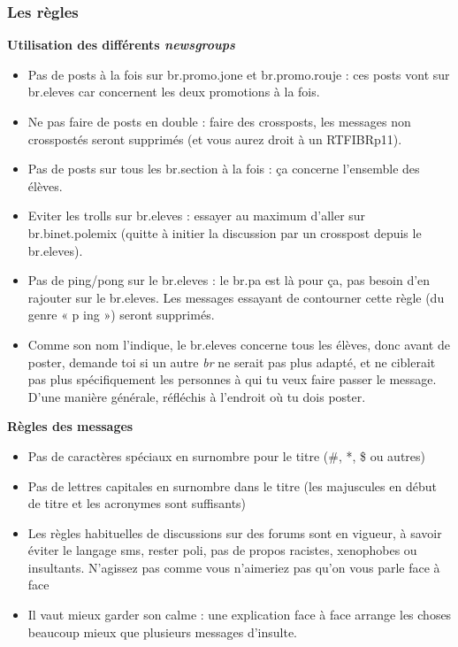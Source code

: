 \subsubsection{Les règles}
\textbf{Utilisation des différents \emph{newsgroups}}
\begin{itemize}
 \item Pas de posts à la fois sur br.promo.jone et br.promo.rouje : ces posts vont sur br.eleves car concernent les deux promotions à
       la fois.
 \item Ne pas faire de posts en double : faire des crossposts, les messages non crosspostés seront supprimés (et vous aurez droit à
       un RTFIBRp11).
 \item Pas de posts sur tous les br.section à la fois : ça concerne l'ensemble des élèves.
 \item Eviter les trolls sur br.eleves : essayer au maximum d'aller sur br.binet.polemix (quitte à initier la discussion par un
       crosspost depuis le br.eleves).
 \item Pas de ping/pong sur le br.eleves : le br.pa est là pour ça, pas besoin d'en rajouter sur le br.eleves. Les messages essayant
       de contourner cette règle (du genre « p ing ») seront supprimés.
 \item Comme son nom l'indique, le br.eleves concerne tous les élèves, donc avant de poster, demande toi si un autre \emph{br} ne serait pas plus adapté, et ne ciblerait pas plus spécifiquement les personnes à qui tu veux faire passer le message. D'une manière générale, réfléchis à l'endroit où tu dois poster.
\end{itemize}

\textbf{Règles des messages}
\begin{itemize}
 \item Pas de caractères spéciaux en surnombre pour le titre (\#, *, \$ ou autres)
 \item Pas de lettres capitales en surnombre dans le titre (les majuscules en début de titre et les acronymes sont suffisants)
 \item Les règles habituelles de discussions sur des forums sont en vigueur, à savoir éviter le langage sms, rester poli, pas de propos racistes, xenophobes ou insultants. N'agissez pas comme vous n'aimeriez pas qu'on vous parle face à face
 \item Il vaut mieux garder son calme : une explication face à face arrange les choses beaucoup mieux que plusieurs messages d'insulte.
\end{itemize}

